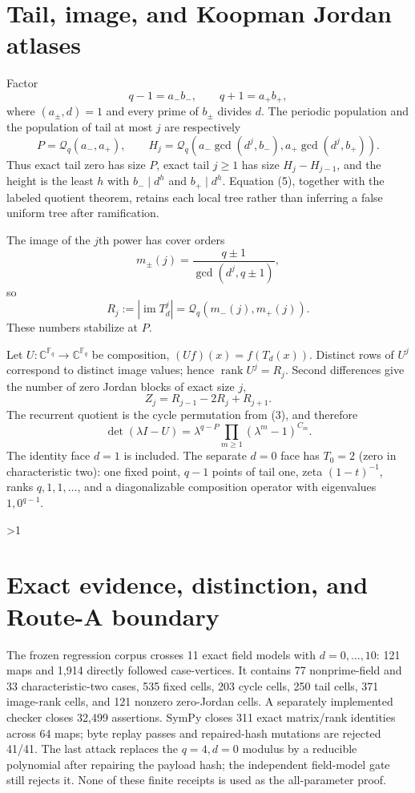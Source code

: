 \documentclass[10pt]{article}
\providecommand{\CRevisionRound}{2}
\newcommand{\Fq}{\mathbb F_q}
\newcommand{\rank}{\operatorname{rank}}
\begin{document}
\section{Tail, image, and Koopman Jordan atlases}
Factor
\[
 q-1=a_-b_-,\qquad q+1=a_+b_+,
\]
where $(a_\pm,d)=1$ and every prime of $b_\pm$ divides $d$.  The periodic
population and the population of tail at most $j$ are respectively
\begin{equation}
 P=\mathcal Q_q(a_-,a_+),\qquad
 H_j=\mathcal Q_q\!\left(a_-\gcd(d^j,b_-),
 a_+\gcd(d^j,b_+)\right).                                \tag{5}
\end{equation}
Thus exact tail zero has size $P$, exact tail $j\geq1$ has size
$H_j-H_{j-1}$, and the height is the least $h$ with
$b_-\mid d^h$ and $b_+\mid d^h$.  Equation (5), together with the labeled
quotient theorem, retains each local tree rather than inferring a false
uniform tree after ramification.

The image of the $j$th power has cover orders
\[
 m_\pm(j)=\frac{q\pm1}{\gcd(d^j,q\pm1)},
\]
so
\begin{equation}
 R_j:=|\operatorname{im}T_d^j|=\mathcal Q_q(m_-(j),m_+(j)). \tag{6}
\end{equation}
These numbers stabilize at $P$.

Let $U:\mathbb C^{\Fq}\to\mathbb C^{\Fq}$ be composition,
$(Uf)(x)=f(T_d(x))$.  Distinct rows of $U^j$ correspond to distinct image
values; hence $\rank U^j=R_j$.  Second differences give the number of zero
Jordan blocks of exact size $j$,
\begin{equation}
 Z_j=R_{j-1}-2R_j+R_{j+1}.                                \tag{7}
\end{equation}
The recurrent quotient is the cycle permutation from (3), and therefore
\begin{equation}
 \det(\lambda I-U)=\lambda^{q-P}
 \prod_{m\geq1}(\lambda^m-1)^{C_m}.                      \tag{8}
\end{equation}
The identity face $d=1$ is included.  The separate $d=0$ face has
$T_0=2$ (zero in characteristic two): one fixed point, $q-1$ points of tail
one, zeta $(1-t)^{-1}$, ranks $q,1,1,\ldots$, and a diagonalizable
composition operator with eigenvalues $1,0^{q-1}$.
\fi

\ifnum\CRevisionRound>1
\section{Exact evidence, distinction, and Route-A boundary}
The frozen regression corpus crosses 11 exact field models with
$d=0,\ldots,10$: 121 maps and 1,914 directly followed case-vertices.  It
contains 77 nonprime-field and 33 characteristic-two cases, 535 fixed cells,
203 cycle cells, 250 tail cells, 371 image-rank cells, and 121 nonzero
zero-Jordan cells.  A separately implemented checker closes 32,499
assertions.  SymPy closes 311 exact matrix/rank identities across 64 maps;
byte replay passes and repaired-hash mutations are rejected 41/41.  The last
attack replaces the $q=4,d=0$ modulus by a reducible polynomial after repairing
the payload hash; the independent field-model gate still rejects it.  None of
these finite receipts is used as the all-parameter proof.
\end{document}

